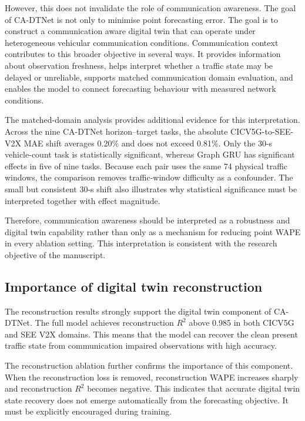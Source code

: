 \documentclass[pdflatex,sn-mathphys-num]{sn-jnl}%
\theoremstyle{thmstyleone}%
\theoremstyle{thmstyletwo}%
\theoremstyle{thmstylethree}%
\begin{document}
However, this does not invalidate the role of communication awareness. The goal of CA-DTNet is not only to minimise point forecasting error. The goal is to construct a communication aware digital twin that can operate under heterogeneous vehicular communication conditions. Communication context contributes to this broader objective in several ways. It provides information about observation freshness, helps interpret whether a traffic state may be delayed or unreliable, supports matched communication domain evaluation, and enables the model to connect forecasting behaviour with measured network conditions.

The matched-domain analysis provides additional evidence for this interpretation. Across the nine CA-DTNet horizon--target tasks, the absolute CICV5G-to-SEE-V2X MAE shift averages 0.20\% and does not exceed 0.81\%. Only the 30-s vehicle-count task is statistically significant, whereas Graph GRU has significant effects in five of nine tasks. Because each pair uses the same 74 physical traffic windows, the comparison removes traffic-window difficulty as a confounder. The small but consistent 30-s shift also illustrates why statistical significance must be interpreted together with effect magnitude.

Therefore, communication awareness should be interpreted as a robustness and digital twin capability rather than only as a mechanism for reducing point WAPE in every ablation setting. This interpretation is consistent with the research objective of the manuscript.

\subsection{Importance of digital twin reconstruction}
\label{subsec:discussion_reconstruction}

The reconstruction results strongly support the digital twin component of CA-DTNet. The full model achieves reconstruction \(R^{2}\) above 0.985 in both CICV5G and SEE V2X domains. This means that the model can recover the clean present traffic state from communication impaired observations with high accuracy.

The reconstruction ablation further confirms the importance of this component. When the reconstruction loss is removed, reconstruction WAPE increases sharply and reconstruction \(R^{2}\) becomes negative. This indicates that accurate digital twin state recovery does not emerge automatically from the forecasting objective. It must be explicitly encouraged during training.
\end{document}
